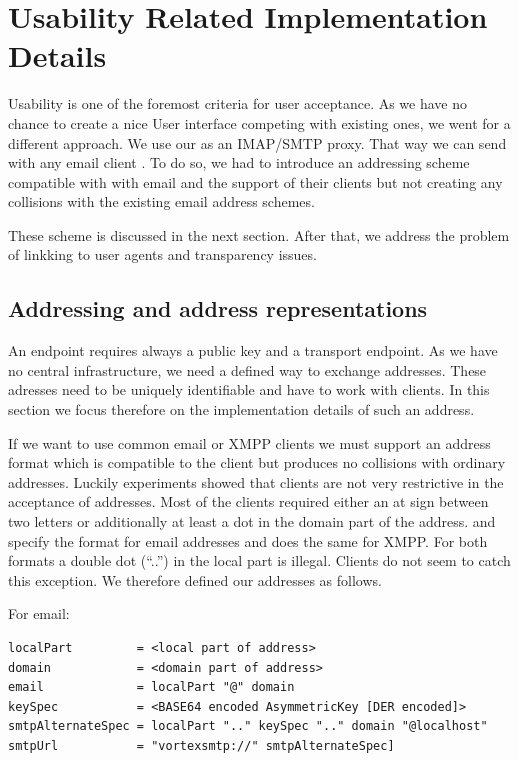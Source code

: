 \chapter{Usability Related Implementation Details}
Usability is one of the foremost criteria for user acceptance. As we have no chance to create a nice User interface competing with existing ones, we  went for a different approach. We use our \VortexNode as an IMAP/SMTP proxy. That way we can send with any email client \VortexMessages. To do so, we had to introduce an addressing scheme compatible with with email and the support of their clients but not creating any collisions with the existing email address schemes.

These scheme is discussed in the next section. After that, we address the problem of linkking to user agents and transparency issues.

\section{Addressing and address representations}
An endpoint requires always a public key and a transport endpoint. As we have no central infrastructure, we need a defined way to exchange addresses. These adresses need to be uniquely identifiable and have to work with clients. In this section we focus therefore on the implementation details of such an address.

If we want to use common email or XMPP clients we must support an address format which is compatible to the client but produces no collisions with ordinary addresses. Luckily experiments showed that clients are not very restrictive in the acceptance of addresses. Most of the clients required either an at sign between two letters or additionally at least a dot in the domain part of the address. \cite{rfc5321} and \cite{rfc5322} specify the format for email addresses and \cite{rfc6120} does the same for XMPP. For both formats a double dot (``..'') in the local part is illegal. Clients do not seem to catch this exception. We therefore defined our addresses as follows.


For email:
\begin{lstlisting}[language=EBNF]
localPart         = <local part of address>
domain            = <domain part of address>
email             = localPart "@" domain
keySpec           = <BASE64 encoded AsymmetricKey [DER encoded]>
smtpAlternateSpec = localPart ".." keySpec ".." domain "@localhost"
smtpUrl           = "vortexsmtp://" smtpAlternateSpec]
\end{lstlisting}

